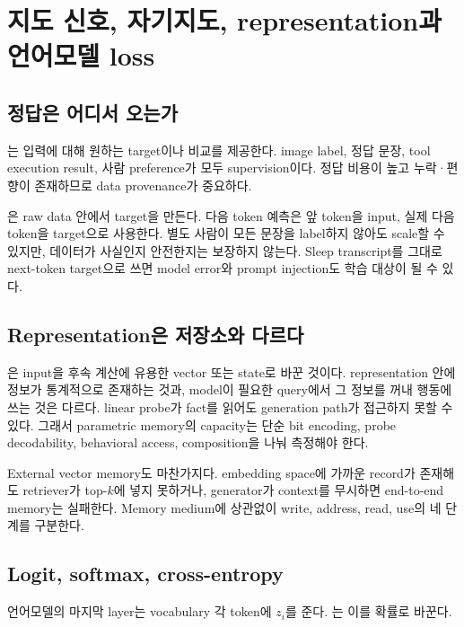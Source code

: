 \chapter{지도 신호, 자기지도, representation과 언어모델 loss}
\label{bg:chapter-supervision}

\section{정답은 어디서 오는가}

는 입력에 대해 원하는 target이나 비교를 제공한다.
image label, 정답 문장, tool execution result, 사람 preference가 모두 supervision이다.
정답 비용이 높고 누락·편향이 존재하므로 data provenance가 중요하다.

은 raw data 안에서 target을 만든다. 다음 token 예측은
앞 token을 input, 실제 다음 token을 target으로 사용한다. 별도 사람이 모든 문장을 label하지
않아도 scale할 수 있지만, 데이터가 사실인지 안전한지는 보장하지 않는다. Sleep transcript를
그대로 next-token target으로 쓰면 model error와 prompt injection도 학습 대상이 될 수 있다.

\section{Representation은 저장소와 다르다}

은 input을 후속 계산에 유용한 vector 또는 state로 바꾼
것이다. representation 안에 정보가 통계적으로 존재하는 것과, model이 필요한 query에서
그 정보를 꺼내 행동에 쓰는 것은 다르다. linear probe가 fact를 읽어도 generation path가
접근하지 못할 수 있다. 그래서 parametric memory의 capacity는 단순 bit encoding, probe
decodability, behavioral access, composition을 나눠 측정해야 한다.

External vector memory도 마찬가지다. embedding space에 가까운 record가 존재해도 retriever가
top-$k$에 넣지 못하거나, generator가 context를 무시하면 end-to-end memory는 실패한다.
Memory medium에 상관없이 write, address, read, use의 네 단계를 구분한다.

\section{Logit, softmax, cross-entropy}

언어모델의 마지막 layer는 vocabulary 각 token에  $z_i$를 준다.
는 이를 확률로 바꾼다.

